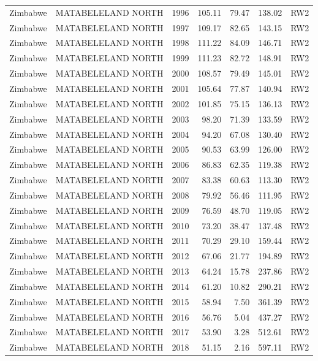 \begin{longtable}{lllrrrl}
  Zimbabwe & MATABELELAND NORTH & 1996 & 105.11 & 79.47 & 138.02 & RW2 \\ 
  Zimbabwe & MATABELELAND NORTH & 1997 & 109.17 & 82.65 & 143.15 & RW2 \\ 
  Zimbabwe & MATABELELAND NORTH & 1998 & 111.22 & 84.09 & 146.71 & RW2 \\ 
  Zimbabwe & MATABELELAND NORTH & 1999 & 111.23 & 82.72 & 148.91 & RW2 \\ 
  Zimbabwe & MATABELELAND NORTH & 2000 & 108.57 & 79.49 & 145.01 & RW2 \\ 
  Zimbabwe & MATABELELAND NORTH & 2001 & 105.64 & 77.87 & 140.94 & RW2 \\ 
  Zimbabwe & MATABELELAND NORTH & 2002 & 101.85 & 75.15 & 136.13 & RW2 \\ 
  Zimbabwe & MATABELELAND NORTH & 2003 & 98.20 & 71.39 & 133.59 & RW2 \\ 
  Zimbabwe & MATABELELAND NORTH & 2004 & 94.20 & 67.08 & 130.40 & RW2 \\ 
  Zimbabwe & MATABELELAND NORTH & 2005 & 90.53 & 63.99 & 126.00 & RW2 \\ 
  Zimbabwe & MATABELELAND NORTH & 2006 & 86.83 & 62.35 & 119.38 & RW2 \\ 
  Zimbabwe & MATABELELAND NORTH & 2007 & 83.38 & 60.63 & 113.30 & RW2 \\ 
  Zimbabwe & MATABELELAND NORTH & 2008 & 79.92 & 56.46 & 111.95 & RW2 \\ 
  Zimbabwe & MATABELELAND NORTH & 2009 & 76.59 & 48.70 & 119.05 & RW2 \\ 
  Zimbabwe & MATABELELAND NORTH & 2010 & 73.20 & 38.47 & 137.48 & RW2 \\ 
  Zimbabwe & MATABELELAND NORTH & 2011 & 70.29 & 29.10 & 159.44 & RW2 \\ 
  Zimbabwe & MATABELELAND NORTH & 2012 & 67.06 & 21.77 & 194.89 & RW2 \\ 
  Zimbabwe & MATABELELAND NORTH & 2013 & 64.24 & 15.78 & 237.86 & RW2 \\ 
  Zimbabwe & MATABELELAND NORTH & 2014 & 61.20 & 10.82 & 290.21 & RW2 \\ 
  Zimbabwe & MATABELELAND NORTH & 2015 & 58.94 & 7.50 & 361.39 & RW2 \\ 
  Zimbabwe & MATABELELAND NORTH & 2016 & 56.76 & 5.04 & 437.27 & RW2 \\ 
  Zimbabwe & MATABELELAND NORTH & 2017 & 53.90 & 3.28 & 512.61 & RW2 \\ 
  Zimbabwe & MATABELELAND NORTH & 2018 & 51.15 & 2.16 & 597.11 & RW2 \\ 

\end{longtable}
